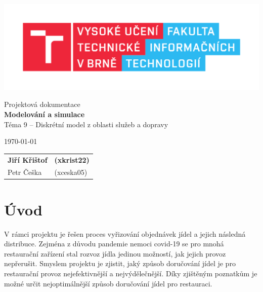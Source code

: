\documentclass[a4paper, 11pt]{article}
\begin{document}
	\begin{titlepage}
		\begin{center}
			\includegraphics[width=0.77\linewidth]{FIT_logo.pdf} \\


			\Huge{Projektová dokumentace} \\
			\LARGE{\textbf{Modelování a simulace}} \\
			\Large{Téma 9 -- Diskrétní model z oblasti služeb a dopravy}
		\end{center}

		\begin{minipage}{0.65 \textwidth}
			{\Large \today}
		\end{minipage}
		\hfill
		\begin{minipage}[r]{0.35 \textwidth}
			\Large
			\begin{tabular}{l l}
				\textbf{Jiří Křištof} & \textbf{(xkrist22)} \\
				Petr Češka & (xceska05) \\
			\end{tabular}
		\end{minipage}
	\end{titlepage}


\section{Úvod}
V rámci projektu je řešen proces vyřizování objednávek jídel a jejich následná distribuce. Zejména z důvodu pandemie nemoci covid-19 se pro mnohá restaurační zařízení stal rozvoz jídla jedinou možností, jak jejich provoz nepřerušit. Smyslem projektu je zjistit, jaký způsob doručování jídel je pro restaurační provoz nejefektivnější a nejvýdělečnější. Díky zjištěným poznatkům je možné určit nejoptimálnější způsob doručování jídel pro restauraci.
\end{document}
